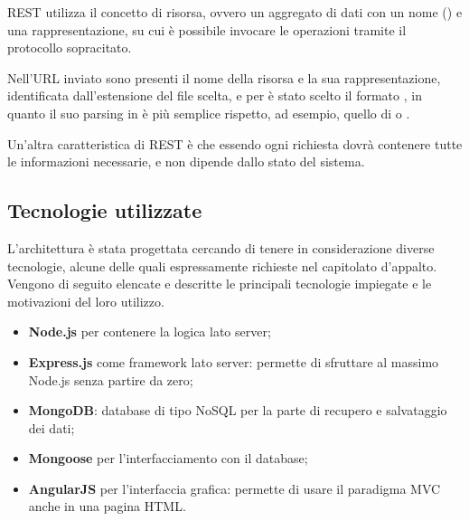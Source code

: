 REST utilizza il concetto di risorsa, ovvero un aggregato di dati con un nome () e una rappresentazione, su cui è possibile invocare le operazioni  tramite il protocollo sopracitato.

Nell'URL inviato sono presenti il nome della risorsa e la sua rappresentazione, identificata dall'estensione del file scelta, e per \ProjectName è stato scelto il formato , in quanto il suo parsing in  è più semplice rispetto, ad esempio, quello di  o .

Un'altra caratteristica di REST è che essendo  ogni richiesta dovrà contenere tutte le informazioni necessarie, e non dipende dallo stato del sistema.

\subsection{Tecnologie utilizzate}
L'architettura è stata progettata cercando di tenere in considerazione diverse tecnologie, alcune delle quali espressamente richieste nel capitolato d'appalto. Vengono di seguito elencate e descritte le principali tecnologie impiegate e le motivazioni del loro utilizzo.

\begin{itemize}
	\item \textbf{Node.js} per contenere la logica lato server;
	\item \textbf{Express.js} come framework lato server: permette di sfruttare al massimo Node.js senza partire da zero;
	\item \textbf{MongoDB}: database di tipo NoSQL per la parte di recupero e salvataggio dei dati;
	\item \textbf{Mongoose} per l’interfacciamento con il database;
	\item \textbf{AngularJS} per l'interfaccia grafica: permette di usare il paradigma MVC anche in una pagina HTML.
\end{itemize}


